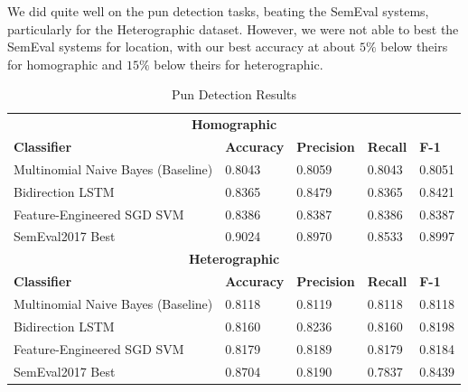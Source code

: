 \documentclass{article}
\begin{document}
We did quite well on the pun detection tasks, beating the SemEval systems,
particularly for the Heterographic dataset. However, we were not able to best
the SemEval systems for location, with our best accuracy at about $5\%$ below
theirs for homographic and $15\%$ below theirs for heterographic.

\begin{table}
\caption{Pun Detection Results}\label{tab:pun_detection_results}
\begin{center}
\begin{tabular}{l l l l l} 
\toprule
\multicolumn{5}{c}{\textbf{Homographic}}\\
\textbf{Classifier}					& \textbf{Accuracy}	& \textbf{Precision}	& \textbf{Recall}	& \textbf{F-1}\\
Multinomial Naive Bayes (Baseline)	& 0.8043			& 0.8059				& 0.8043			& 0.8051\\
Bidirection LSTM					& 0.8365			& 0.8479				& 0.8365			& 0.8421\\
Feature-Engineered SGD SVM			& 0.8386			& 0.8387				& 0.8386			& 0.8387\\
SemEval2017 Best					& 0.9024			& 0.8970				& 0.8533			& 0.8997\\
\midrule
\multicolumn{5}{c}{\textbf{Heterographic}}\\
\textbf{Classifier}					& \textbf{Accuracy}	& \textbf{Precision}	& \textbf{Recall}	& \textbf{F-1}\\
Multinomial Naive Bayes (Baseline)	& 0.8118			&  0.8119				& 0.8118			& 0.8118\\
Bidirection LSTM					& 0.8160			& 0.8236				& 0.8160			& 0.8198\\
Feature-Engineered SGD SVM			& 0.8179			& 0.8189				& 0.8179			& 0.8184\\
SemEval2017 Best					& 0.8704			& 0.8190				& 0.7837			& 0.8439\\
\bottomrule
\end{tabular}
\end{center}
\end{table}
\end{document}
